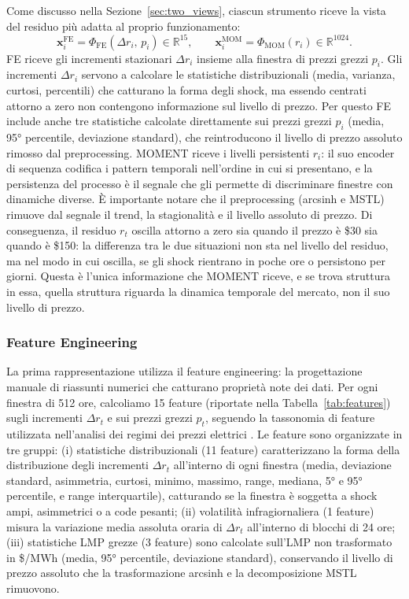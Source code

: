 \documentclass[12pt]{article}
\begin{document}
Come discusso nella Sezione~\ref{sec:two_views}, ciascun strumento riceve la vista del residuo più adatta al proprio funzionamento:
\begin{equation}
\mathbf{x}_i^\text{FE} = \Phi_\text{FE}(\Delta r_i,\, p_i) \in \mathbb{R}^{15},
\qquad
\mathbf{x}_i^\text{MOM} = \Phi_\text{MOM}(r_i) \in \mathbb{R}^{1024}.
\label{eq:representations}
\end{equation}
FE riceve gli incrementi stazionari $\Delta r_i$ insieme alla finestra di prezzi grezzi $p_i$.
Gli incrementi $\Delta r_i$ servono a calcolare le statistiche distribuzionali (media, varianza, curtosi, percentili) che catturano la forma degli shock, ma essendo centrati attorno a zero non contengono informazione sul livello di prezzo.
Per questo FE include anche tre statistiche calcolate direttamente sui prezzi grezzi $p_i$ (media, 95° percentile, deviazione standard), che reintroducono il livello di prezzo assoluto rimosso dal preprocessing.
MOMENT riceve i livelli persistenti $r_i$: il suo encoder di sequenza codifica i pattern temporali nell'ordine in cui si presentano, e la persistenza del processo è il segnale che gli permette di discriminare finestre con dinamiche diverse.
È importante notare che il preprocessing (arcsinh e MSTL) rimuove dal segnale il trend, la stagionalità e il livello assoluto di prezzo.
Di conseguenza, il residuo $r_t$ oscilla attorno a zero sia quando il prezzo è \$30 sia quando è \$150: la differenza tra le due situazioni non sta nel livello del residuo, ma nel modo in cui oscilla, se gli shock rientrano in poche ore o persistono per giorni.
Questa è l'unica informazione che MOMENT riceve, e se trova struttura in essa, quella struttura riguarda la dinamica temporale del mercato, non il suo livello di prezzo.

\subsubsection{Feature Engineering}
\label{sec:repr_fe}

La prima rappresentazione utilizza il feature engineering: la progettazione manuale di riassunti numerici che catturano proprietà note dei dati.
Per ogni finestra di 512 ore, calcoliamo 15 feature (riportate nella Tabella~\ref{tab:features}) sugli incrementi $\Delta r_t$ e sui prezzi grezzi $p_t$, seguendo la tassonomia di feature utilizzata nell'analisi dei regimi dei prezzi elettrici \citep{escribano2011, knittel2005}.
Le feature sono organizzate in tre gruppi:
(i) statistiche distribuzionali (11 feature) caratterizzano la forma della distribuzione degli incrementi $\Delta r_t$ all'interno di ogni finestra (media, deviazione standard, asimmetria, curtosi, minimo, massimo, range, mediana, 5° e 95° percentile, e range interquartile), catturando se la finestra è soggetta a shock ampi, asimmetrici o a code pesanti;
(ii) volatilità infragiornaliera (1 feature) misura la variazione media assoluta oraria di $\Delta r_t$ all'interno di blocchi di 24 ore;
(iii) statistiche LMP grezze (3 feature) sono calcolate sull'LMP non trasformato in \$/MWh (media, 95° percentile, deviazione standard), conservando il livello di prezzo assoluto che la trasformazione arcsinh e la decomposizione MSTL rimuovono.
\end{document}
